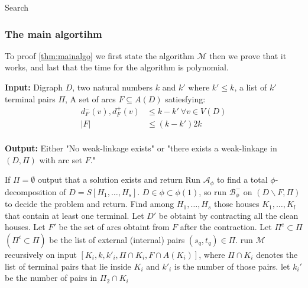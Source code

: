 \documentclass{beamer}
\renewcommand{\algorithmicrequire}{\textbf{Input:}}
\renewcommand{\algorithmicensure}{\textbf{Output:}}
\newcommand{\alginput}[1]{\hspace*{\algorithmicindent}\algorithmicrequire{#1}}
\newcommand{\algoutput}[1]{\hspace*{\algorithmicindent}\algorithmicensure{#1}}
\newcommand{\algio}[2]{
	\alginput{#1}\\
	\algoutput{#2}
}
\begin{document}
\begin{frame}[allowframebreaks]{Search}
    \frametitle{The main algortihm}
    To proof \autoref{thm:mainalgo} we first state the algorithm $\mathcal{M}$ then we prove that it works, and last that the time for the algorithm is polynomial.
    \algio{
        Digraph $D$, two natural numbers $k$ and $k'$ where $k'\leq k$, a list of $k'$ terminal pairs $\Pi$, A set of arcs $F\subseteq A(D)$ satiesfying:
        \begin{align*}
            d^-_F(v),d^+_F(v)&\leq k-k' \ \forall v\in V(D)\\
            |F|&\leq (k-k')2k
        \end{align*}
    }{
        Either "No weak-linkage exists" or "there exists a weak-linkage in $(D,\Pi)$ with arc set $F$."
    }
    \begin{algorithmic}[1]
        \STATE If $\Pi=\emptyset$ output that a solution exists and return
        \STATE Run $\mathcal{A}_{\phi}$ to find a total $\phi$-decomposition of $D=S[H_1,\dots,H_s]$.
            \STATE $D\in \phi\subset \phi(1)$, so run $\mathcal{B}^-_{\phi}$ on $(D\backslash F,\Pi)$ to decide the problem and return.
        \ENDIF
        \STATE Find among $H_1,\dots, H_s$ those houses $K_1,\dots , K_l$ that contain at least one terminal. 
        Let $D'$ be obtaint by contracting all the clean houses. 
        Let $F'$ be the set of arcs obtaint from $F$ after the contraction.
        \STATE Let $\Pi^e\subset \Pi$ $(\Pi^i\subset \Pi)$ be the list of external (internal) pairs $(s_q,t_q)\in \Pi$.
             \label{state:6a}
                \STATE run $\mathcal{M}$ recursively on input $[K_i, k, k'_i,\Pi \cap K_i, F\cap A(K_i)]$, where $\Pi \cap K_i$ denotes the list of terminal pairs that lie inside $K_i$ and $k'_i$ is the number of those pairs.
            \ENDIF
             \label{state:6b}
                \STATE let $k_i'$ be the number of pairs in $\Pi _2\cap K_i$
\end{algorithmic}
\end{frame}
\end{document}
